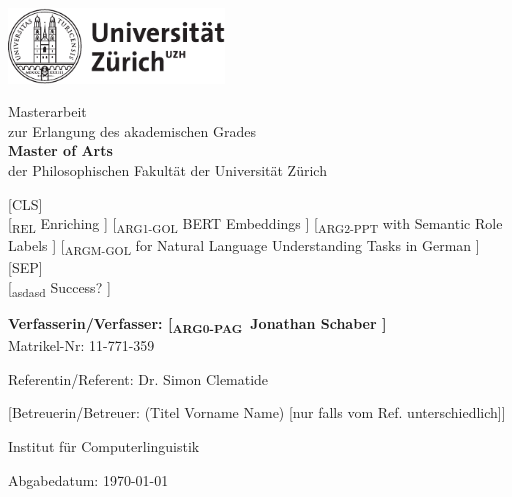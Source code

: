 \begin{titlepage}
\includegraphics[height=20mm]{images/uzh_logo_d_pos}\\

\begin{center}

{\sffamily
Masterarbeit \\
zur Erlangung des akademischen Grades \\
\textbf{Master of Arts} \\
der Philosophischen Fakultät der Universität Zürich \\

\vspace{2cm}

{\Large {\color{light-yellow} [CLS]} \\
        {\color{light-gray} [\textsubscript{REL}} Enriching{\color{light-gray} ]}
        {\color{light-gray} [\textsubscript{ARG1-GOL}} BERT Embeddings{\color{light-gray} ]}
        {\color{light-gray} [\textsubscript{ARG2-PPT}} with Semantic Role Labels{\color{light-gray} ]}
        {\color{light-gray} [\textsubscript{ARGM-GOL}} for Natural Language Understanding Tasks in German{\color{light-gray} ]} \\
        {\color{light-yellow} [SEP]} \\
        {\color{light-gray} [\textsubscript{asdasd}} Success?{\color{light-gray} ]}
}\\

\vspace{4cm}

\textbf{Verfasserin/Verfasser: {\color{light-gray} [\textsubscript{ARG0-PAG}} Jonathan Schaber{\color{light-gray} ]}} \\
	Matrikel-Nr: 11-771-359 \\

\vspace{2cm}

Referentin/Referent: Dr. Simon Clematide

[Betreuerin/Betreuer: (Titel Vorname Name) {\small [nur falls vom Ref. unterschiedlich]}]

Institut f\"ur Computerlinguistik

\vfill Abgabedatum: \today

\vspace{3cm}
}
\end{center}

\end{titlepage}

\newpage

